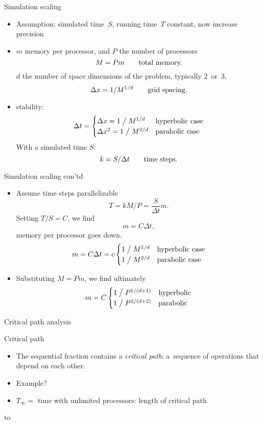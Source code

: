 \begin{numberedframe}{Simulation scaling}
  \begin{itemize}
  \item Assumption: simulated time~$S$, running time~$T$ constant, now increase precision
  \item  $m$ memory per processor, and $P$ the number of processors
    \[ M=Pm\qquad\hbox{total memory.} \]
    $d$ the number of space dimensions of the problem, typically 2~or~3,
    \[ \Delta x = 1/M^{1/d}\qquad\hbox{grid spacing.} \]
  \item stability:
    \[ \Delta t=
    \begin{cases}
      \Delta x=1\bigm/M^{1/d}&\hbox{hyperbolic case}\\
      \Delta x^2=1\bigm/M^{2/d}&\hbox{parabolic case}
    \end{cases}
    \]
    With a simulated time $S$:
    \[ k=S/\Delta t\qquad \hbox{time steps.} \]
  \end{itemize}     
\end{numberedframe}

\begin{numberedframe}{Simulation scaling con'td}
  \begin{itemize}
  \item Assume time steps parallelizable
    \[ T=kM/P=\frac{S}{\Delta t}m. \]
    Setting $T/S=C$, we find
    \[ m=C\Delta t, \]
    memory per processor goes down.
    \[ m=C\Delta t = c
    \begin{cases}
      1\bigm/M^{1/d}&\hbox{hyperbolic case}\\
      1\bigm/M^{2/d}&\hbox{parabolic case}
    \end{cases}
    \]
  \item Substituting $M=Pm$, we find ultimately
    \[ m = C
    \begin{cases}
      1\bigm/P^{1/(d+1)}&\hbox{hyperbolic}\\
      1\bigm/P^{2/(d+2)}&\hbox{parabolic}
    \end{cases}
    \]
  \end{itemize}
\end{numberedframe}

 {Critical path analysis}

\begin{numberedframe}{Critical path}
  \begin{itemize}
  \item The sequential fraction contains a \textsl{critical path}:
    a~sequence of operations that depend on each other.
  \item Example?
  \item $T_\infty=$ time with unlimited processors: length of critical path.
  \end{itemize}
  \hbox to 
\end{numberedframe}

